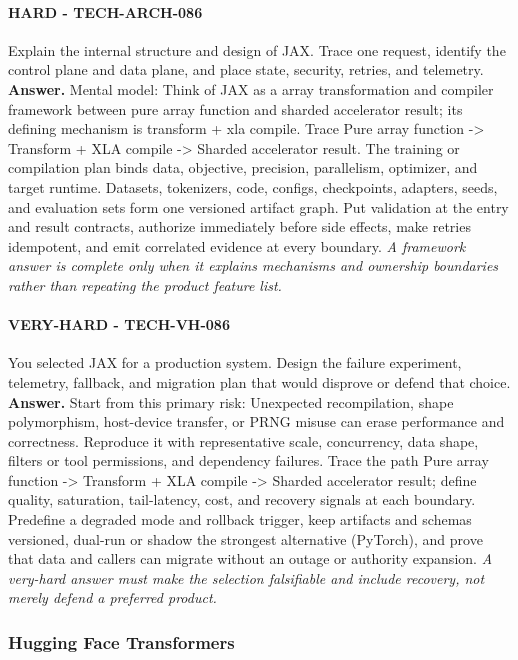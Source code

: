 \paragraph{HARD - TECH-ARCH-086} Explain the internal structure and design of JAX. Trace one request, identify the control plane and data plane, and place state, security, retries, and telemetry.
\textbf{Answer.} Mental model: Think of JAX as a array transformation and compiler framework between pure array function and sharded accelerator result; its defining mechanism is transform + xla compile. Trace Pure array function -> Transform + XLA compile -> Sharded accelerator result. The training or compilation plan binds data, objective, precision, parallelism, optimizer, and target runtime. Datasets, tokenizers, code, configs, checkpoints, adapters, seeds, and evaluation sets form one versioned artifact graph. Put validation at the entry and result contracts, authorize immediately before side effects, make retries idempotent, and emit correlated evidence at every boundary.
\textit{A framework answer is complete only when it explains mechanisms and ownership boundaries rather than repeating the product feature list.}
\paragraph{VERY-HARD - TECH-VH-086} You selected JAX for a production system. Design the failure experiment, telemetry, fallback, and migration plan that would disprove or defend that choice.
\textbf{Answer.} Start from this primary risk: Unexpected recompilation, shape polymorphism, host-device transfer, or PRNG misuse can erase performance and correctness. Reproduce it with representative scale, concurrency, data shape, filters or tool permissions, and dependency failures. Trace the path Pure array function -> Transform + XLA compile -> Sharded accelerator result; define quality, saturation, tail-latency, cost, and recovery signals at each boundary. Predefine a degraded mode and rollback trigger, keep artifacts and schemas versioned, dual-run or shadow the strongest alternative (PyTorch), and prove that data and callers can migrate without an outage or authority expansion.
\textit{A very-hard answer must make the selection falsifiable and include recovery, not merely defend a preferred product.}
\subsubsection*{Hugging Face Transformers}
